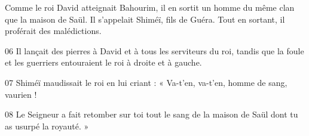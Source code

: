 Comme le roi David atteignait Bahourim, il en sortit un homme du même clan que la maison de Saül. Il s’appelait Shiméï, fils de Guéra. Tout en sortant, il proférait des malédictions.

06 Il lançait des pierres à David et à tous les serviteurs du roi, tandis que la foule et les guerriers entouraient le roi à droite et à gauche.

07 Shiméï maudissait le roi en lui criant : « Va-t’en, va-t’en, homme de sang, vaurien !

08 Le Seigneur a fait retomber sur toi tout le sang de la maison de Saül dont tu as usurpé la royauté. »
